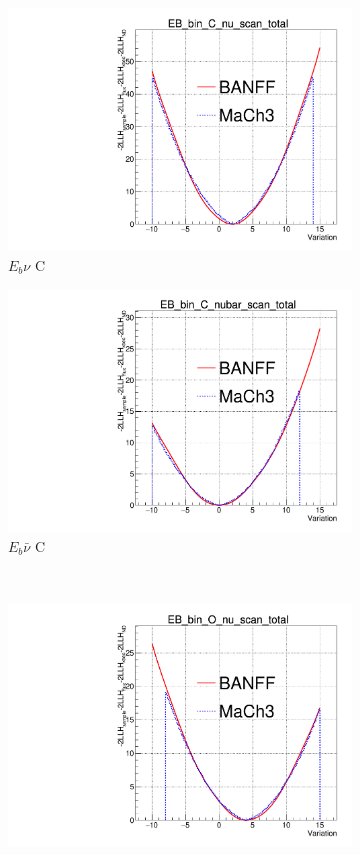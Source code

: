 \begin{figure}
\centering
\begin{subfigure}{.48\textwidth}
  \centering
  \includegraphics[width=0.73\linewidth]{figs/EB_dial_C_nu_full_FullLLH}
  \caption{$E_{b}\nu$ C}
\end{subfigure}
\begin{subfigure}{.48\textwidth}
  \centering
  \includegraphics[width=0.73\linewidth]{figs/EB_dial_C_nubar_full_FullLLH}
  \caption{$E_{b}\bar{\nu}$ C}
\end{subfigure} \\
\begin{subfigure}{.48\textwidth}
  \centering
  \includegraphics[width=0.73\linewidth]{figs/EB_dial_O_nu_full_FullLLH}

\end{subfigure}
\end{figure}
